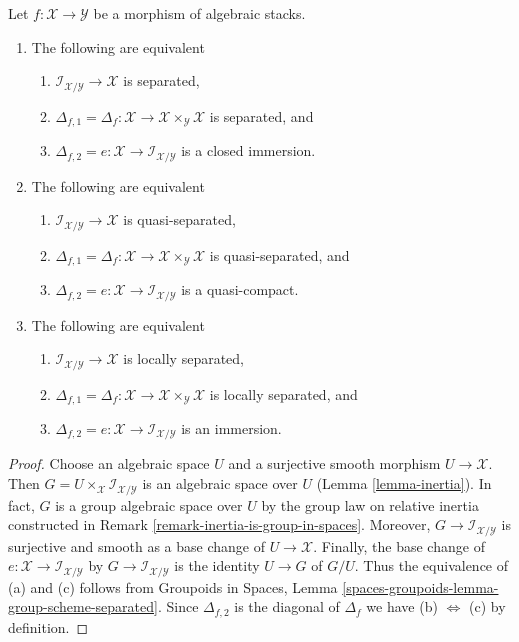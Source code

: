 \begin{lemma}
\label{lemma-diagonal-diagonal}
Let $f : \mathcal{X} \to \mathcal{Y}$ be a morphism of algebraic stacks.
\begin{enumerate}
\item
The following are equivalent
\begin{enumerate}
\item $\mathcal{I}_{\mathcal{X}/\mathcal{Y}} \to \mathcal{X}$
is separated,
\item $\Delta_{f, 1} = \Delta_f :
\mathcal{X} \to \mathcal{X} \times_\mathcal{Y} \mathcal{X}$
is separated, and
\item $\Delta_{f, 2} = e :
\mathcal{X} \to \mathcal{I}_{\mathcal{X}/\mathcal{Y}}$
is a closed immersion.
\end{enumerate}
\item
The following are equivalent
\begin{enumerate}
\item $\mathcal{I}_{\mathcal{X}/\mathcal{Y}} \to \mathcal{X}$
is quasi-separated,
\item $\Delta_{f, 1} = \Delta_f :
\mathcal{X} \to \mathcal{X} \times_\mathcal{Y} \mathcal{X}$
is quasi-separated, and
\item $\Delta_{f, 2} = e :
\mathcal{X} \to \mathcal{I}_{\mathcal{X}/\mathcal{Y}}$
is a quasi-compact.
\end{enumerate}
\item
The following are equivalent
\begin{enumerate}
\item $\mathcal{I}_{\mathcal{X}/\mathcal{Y}} \to \mathcal{X}$
is locally separated,
\item $\Delta_{f, 1} = \Delta_f :
\mathcal{X} \to \mathcal{X} \times_\mathcal{Y} \mathcal{X}$
is locally separated, and
\item $\Delta_{f, 2} = e :
\mathcal{X} \to \mathcal{I}_{\mathcal{X}/\mathcal{Y}}$
is an immersion.
\end{enumerate}
\end{enumerate}
\end{lemma}

\begin{proof}
Choose an algebraic space $U$ and a surjective smooth morphism
$U \to \mathcal{X}$. Then
$G = U \times_\mathcal{X} \mathcal{I}_{\mathcal{X}/\mathcal{Y}}$
is an algebraic space over $U$ (Lemma \ref{lemma-inertia}).
In fact, $G$ is a group algebraic space over $U$
by the group law on relative
inertia constructed in Remark \ref{remark-inertia-is-group-in-spaces}.
Moreover, $G \to \mathcal{I}_{\mathcal{X}/\mathcal{Y}}$
is surjective and smooth as a base change of $U \to \mathcal{X}$.
Finally, the base change of
$e : \mathcal{X} \to \mathcal{I}_{\mathcal{X}/\mathcal{Y}}$
by $G \to \mathcal{I}_{\mathcal{X}/\mathcal{Y}}$
is the identity $U \to G$ of $G/U$.
Thus the equivalence of (a) and (c) follows from
Groupoids in Spaces, Lemma
\ref{spaces-groupoids-lemma-group-scheme-separated}.
Since $\Delta_{f, 2}$ is the diagonal of $\Delta_f$ we have
(b) $\Leftrightarrow$ (c) by definition.
\end{proof}

